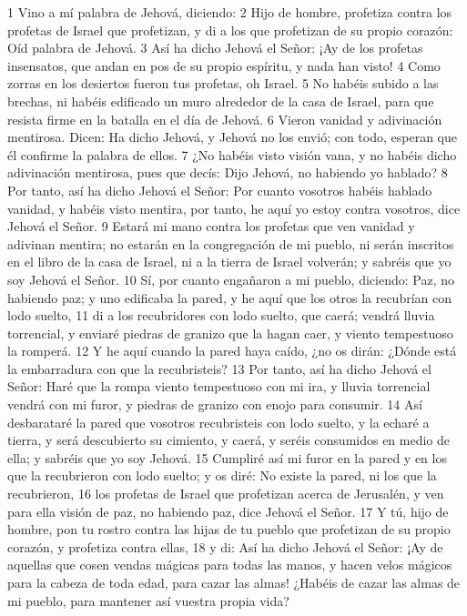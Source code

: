 1 Vino a mí palabra de Jehová, diciendo:
2 Hijo de hombre, profetiza contra los profetas de Israel que profetizan, y di a los que profetizan de su propio corazón: Oíd palabra de Jehová.
3 Así ha dicho Jehová el Señor: ¡Ay de los profetas insensatos, que andan en pos de su propio espíritu, y nada han visto!
4 Como zorras en los desiertos fueron tus profetas, oh Israel.
5 No habéis subido a las brechas, ni habéis edificado un muro alrededor de la casa de Israel, para que resista firme en la batalla en el día de Jehová.
6 Vieron vanidad y adivinación mentirosa. Dicen: Ha dicho Jehová, y Jehová no los envió; con todo, esperan que él confirme la palabra de ellos.
7 ¿No habéis visto visión vana, y no habéis dicho adivinación mentirosa, pues que decís: Dijo Jehová, no habiendo yo hablado?
8 Por tanto, así ha dicho Jehová el Señor: Por cuanto vosotros habéis hablado vanidad, y habéis visto mentira, por tanto, he aquí yo estoy contra vosotros, dice Jehová el Señor.
9 Estará mi mano contra los profetas que ven vanidad y adivinan mentira; no estarán en la congregación de mi pueblo, ni serán inscritos en el libro de la casa de Israel, ni a la tierra de Israel volverán; y sabréis que yo soy Jehová el Señor.
10 Sí, por cuanto engañaron a mi pueblo, diciendo: Paz, no habiendo paz; y uno edificaba la pared, y he aquí que los otros la recubrían con lodo suelto,
11 di a los recubridores con lodo suelto, que caerá; vendrá lluvia torrencial, y enviaré piedras de granizo que la hagan caer, y viento tempestuoso la romperá.
12 Y he aquí cuando la pared haya caído, ¿no os dirán: ¿Dónde está la embarradura con que la recubristeis?
13 Por tanto, así ha dicho Jehová el Señor: Haré que la rompa viento tempestuoso con mi ira, y lluvia torrencial vendrá con mi furor, y piedras de granizo con enojo para consumir.
14 Así desbarataré la pared que vosotros recubristeis con lodo suelto, y la echaré a tierra, y será descubierto su cimiento, y caerá, y seréis consumidos en medio de ella; y sabréis que yo soy Jehová.
15 Cumpliré así mi furor en la pared y en los que la recubrieron con lodo suelto; y os diré: No existe la pared, ni los que la recubrieron,
16 los profetas de Israel que profetizan acerca de Jerusalén, y ven para ella visión de paz, no habiendo paz, dice Jehová el Señor.
17 Y tú, hijo de hombre, pon tu rostro contra las hijas de tu pueblo que profetizan de su propio corazón, y profetiza contra ellas,
18 y di: Así ha dicho Jehová el Señor: ¡Ay de aquellas que cosen vendas mágicas para todas las manos, y hacen velos mágicos para la cabeza de toda edad, para cazar las almas! ¿Habéis de cazar las almas de mi pueblo, para mantener así vuestra propia vida?

